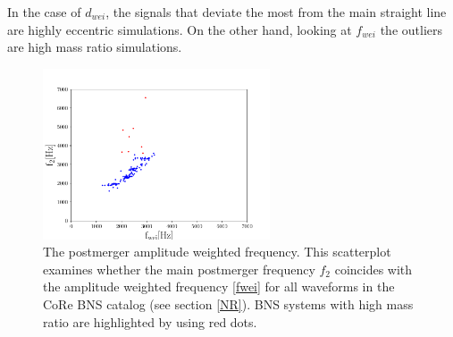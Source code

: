 \newpage
In the case of $d_{wei}$, the signals that deviate the most from the main straight line are highly eccentric simulations. On the other hand, looking at  $f_{wei}$ the outliers are high mass ratio simulations.

\begin{figure}[hbt!]
\begin{center}
\includegraphics[width=0.6\textwidth, angle=0]{images/Data_analysis/results/f2.pdf}
\captionsetup{width=0.8\textwidth}
\caption[The postmerger amplitude weighted frequency]{The postmerger amplitude weighted frequency. This scatterplot examines whether the main postmerger frequency $f_2$ coincides with the amplitude weighted frequency \ref{fwei} for all waveforms in the CoRe BNS catalog (see section \ref{NR}). BNS systems with high mass ratio are highlighted by using red dots.}
\label{duration measure}
\end{center}
\end{figure}

\FloatBarrier









